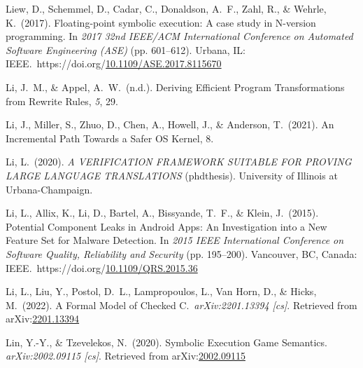 \documentclass[12pt,twoside]{article}
\begin{document}
{\begin{thebibliography}{1079}
\mdbibitemlabel{}Liew, D., Schemmel, D., Cadar, C., Donaldson, A.~F., Zahl, R., \& Wehrle, K.~(2017). Floating-point symbolic execution: A case study in N-version programming. In \emph{2017 32nd IEEE/ACM International Conference on Automated Software Engineering (ASE)} (pp. 601–612). Urbana, IL: IEEE.~https://doi.org/\href{https://dx.doi.org/10.1109/ASE.2017.8115670}{10.1109/ASE.2017.8115670}%

\mdbibitemlabel{}Li, J.~M., \& Appel, A.~W.~(n.d.). Deriving Efficient Program Transformations from Rewrite Rules, \emph{5}, 29.%

\mdbibitemlabel{}Li, J., Miller, S., Zhuo, D., Chen, A., Howell, J., \& Anderson, T.~(2021). An Incremental Path Towards a Safer OS Kernel, 8.%

\mdbibitemlabel{}Li, L.~(2020). \emph{A VERIFICATION FRAMEWORK SUITABLE FOR PROVING LARGE LANGUAGE TRANSLATIONS} (phdthesis). University of Illinois at Urbana-Champaign.%

\mdbibitemlabel{}Li, L., Allix, K., Li, D., Bartel, A., Bissyande, T.~F., \& Klein, J.~(2015). Potential Component Leaks in Android Apps: An Investigation into a New Feature Set for Malware Detection. In \emph{2015 IEEE International Conference on Software Quality, Reliability and Security} (pp. 195–200). Vancouver, BC, Canada: IEEE.~https://doi.org/\href{https://dx.doi.org/10.1109/QRS.2015.36}{10.1109/QRS.2015.36}%

\mdbibitemlabel{}Li, L., Liu, Y., Postol, D.~L., Lampropoulos, L., Van Horn, D., \& Hicks, M.~(2022). A Formal Model of Checked C.~\emph{arXiv:2201.13394 {}[cs]}. Retrieved from arXiv:\href{http://arxiv.org/abs/2201.13394}{2201.13394}%

\mdbibitemlabel{}Lin, Y.-Y., \& Tzevelekos, N.~(2020). Symbolic Execution Game Semantics. \emph{arXiv:2002.09115 {}[cs]}. Retrieved from arXiv:\href{http://arxiv.org/abs/2002.09115}{2002.09115}%


\end{thebibliography}}
\end{document}
